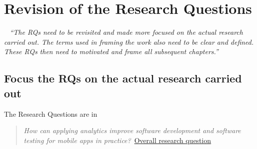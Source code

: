 \section{Revision of the Research Questions}~\label{corrections-rqs}
\emph{``The RQs need to be revisited and made more focused on the actual research carried out. The terms used in framing the work also need to be clear and defined. These RQs then need to motivated and frame all subsequent chapters.''}

\subsection{Focus the RQs on the actual research carried out}
The Research Questions are in 

\begin{kaobox}[frametitle=The original RQ]
\begin{quote}
  \emph{How can applying analytics improve software development and software testing for mobile apps in practice?}~\href{overall-research-question}{Overall research question}
\end{quote}    
\end{kaobox}




